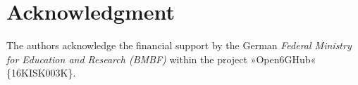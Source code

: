 \section*{Acknowledgment}%

The authors acknowledge the financial support by the German \textit{Federal Ministry for Education and Research (BMBF)} within the project »Open6GHub« \{16KISK003K\}.
%
